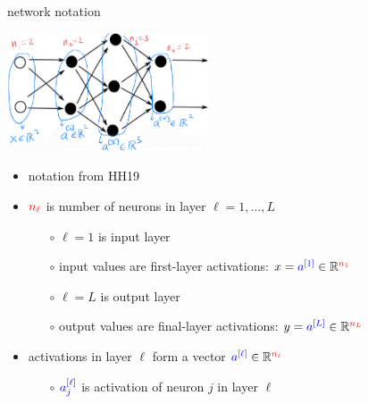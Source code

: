 \documentclass[xcolor={svgnames},
               hyperref={colorlinks,citecolor=DeepPink4,linkcolor=FireBrick,urlcolor=Maroon}]
               {beamer}
\newcommand{\RR}{\mathbb{R}}
\begin{document}
\begin{frame}{network notation}

\begin{center}
\includegraphics[height=35mm]{figs/state-notation}
\end{center}

\begin{itemize}
\item notation from HH19
\item ${\color{red} n_\ell}$ is number of neurons in layer $\ell=1,\dots,L$
    \begin{itemize}
    \item[$\circ$] $\ell=1$ is \alert{input} layer
    \item[$\circ$] input values are first-layer activations: $x = {\color{blue} a^{[1]}} \in \RR^{{\color{red} n_1}}$
    \item[$\circ$] $\ell=L$ is \alert{output} layer
    \item[$\circ$] output values are final-layer activations: $y = {\color{blue} a^{[L]}} \in \RR^{{\color{red} n_L}}$
    \end{itemize}
\item activations in layer $\ell$ form a vector ${\color{blue} a^{[\ell]}} \in \RR^{{\color{red} n_\ell}}$
    \begin{itemize}
    \item[$\circ$] ${\color{blue} a_j^{[\ell]}}$ is activation of neuron $j$ in layer $\ell$
    \end{itemize}
\end{itemize}
\end{frame}
\end{document}
